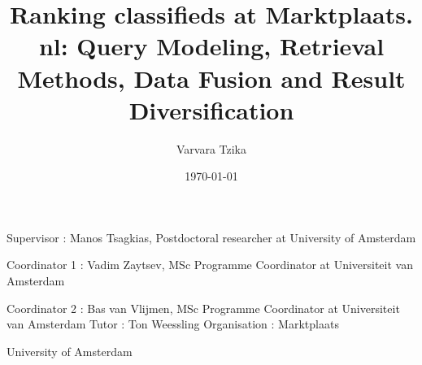 \documentclass[a4paper, 12pt]{report}
\title{Ranking classifieds at Marktplaats. nl: Query Modeling, Retrieval Methods, Data Fusion and Result Diversification}
\author{Varvara Tzika}
\date{\today}
\begin{document}
\maketitle

Supervisor : Manos Tsagkias, \bigskip
Postdoctoral researcher at University of Amsterdam \bigskip

Coordinator 1 : Vadim Zaytsev, \bigskip
MSc Programme Coordinator at Universiteit van Amsterdam

Coordinator 2 : Bas van Vlijmen, \bigskip
MSc Programme Coordinator at Universiteit van Amsterdam
\bigskip
Tutor : Ton Weessling \bigskip
Organisation : Marktplaats \bigskip

University of Amsterdam



















\end{document}
